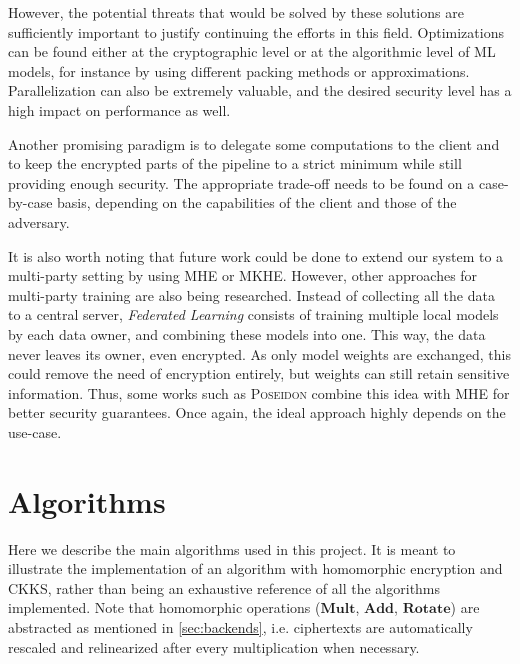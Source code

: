 \documentclass[a4paper,11pt,oneside]{report}
\begin{document}
However, the potential threats that would be solved by these solutions are sufficiently important to justify continuing the efforts in this field.
Optimizations can be found either at the cryptographic level or at the algorithmic level of ML models, for instance by using different packing methods or approximations.
Parallelization can also be extremely valuable, and the desired security level has a high impact on performance as well.

Another promising paradigm is to delegate some computations to the client and to keep the encrypted parts of the pipeline to a strict minimum while still providing enough security. 
The appropriate trade-off needs to be found on a case-by-case basis, depending on the capabilities of the client and those of the adversary.

It is also worth noting that future work could be done to extend our system to a multi-party setting by using MHE or MKHE. 
However, other approaches for multi-party training are also being researched. 
Instead of collecting all the data to a central server, \emph{Federated Learning} consists of training multiple local models by each data owner, and combining these models into one.
This way, the data never leaves its owner, even encrypted.
As only model weights are exchanged, this could remove the need of encryption entirely, but weights can still retain sensitive information.
Thus, some works such as \textsc{Poseidon} \cite{sav_poseidon_2021} combine this idea with MHE for better security guarantees.
Once again, the ideal approach highly depends on the use-case. 


\cleardoublepage
{}
{}
\printbibliography

\appendix
\chapter{Algorithms}

Here we describe the main algorithms used in this project. 
It is meant to illustrate the implementation of an algorithm with homomorphic encryption and CKKS, rather than being an exhaustive reference of all the algorithms implemented. 
Note that homomorphic operations ($\mathbf{Mult}$, $\mathbf{Add}$, $\mathbf{Rotate}$) are abstracted as mentioned in \autoref{sec:backends}, i.e. ciphertexts are automatically rescaled and relinearized after every multiplication when necessary.
\end{document}
